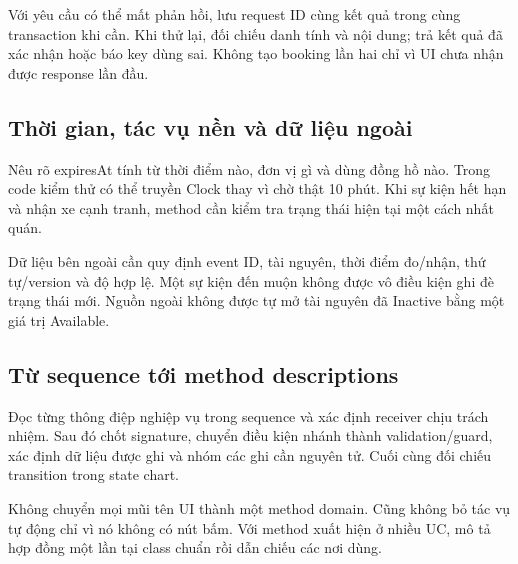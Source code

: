 Với yêu cầu có thể mất phản hồi, lưu request ID cùng kết quả trong cùng transaction khi cần. Khi thử lại, đối chiếu danh tính và nội dung; trả kết quả đã xác nhận hoặc báo key dùng sai. Không tạo booking lần hai chỉ vì UI chưa nhận được response lần đầu.

\subsection{Thời gian, tác vụ nền và dữ liệu ngoài}
Nêu rõ expiresAt tính từ thời điểm nào, đơn vị gì và dùng đồng hồ nào. Trong code kiểm thử có thể truyền Clock thay vì chờ thật 10 phút. Khi sự kiện hết hạn và nhận xe cạnh tranh, method cần kiểm tra trạng thái hiện tại một cách nhất quán.

Dữ liệu bên ngoài cần quy định event ID, tài nguyên, thời điểm đo/nhận, thứ tự/version và độ hợp lệ. Một sự kiện đến muộn không được vô điều kiện ghi đè trạng thái mới. Nguồn ngoài không được tự mở tài nguyên đã Inactive bằng một giá trị Available.

\subsection{Từ sequence tới method descriptions}
Đọc từng thông điệp nghiệp vụ trong sequence và xác định receiver chịu trách nhiệm. Sau đó chốt signature, chuyển điều kiện nhánh thành validation/guard, xác định dữ liệu được ghi và nhóm các ghi cần nguyên tử. Cuối cùng đối chiếu transition trong state chart.

Không chuyển mọi mũi tên UI thành một method domain. Cũng không bỏ tác vụ tự động chỉ vì nó không có nút bấm. Với method xuất hiện ở nhiều UC, mô tả hợp đồng một lần tại class chuẩn rồi dẫn chiếu các nơi dùng.
